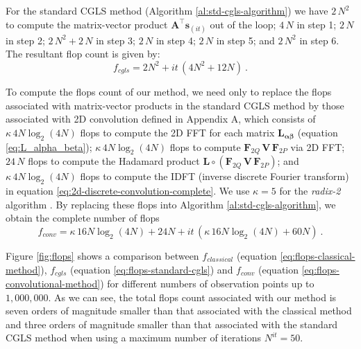 \documentclass[manuscript,noblind]{geophysics}
\begin{document}
For the standard CGLS method (Algorithm \ref{al:std-cgls-algorithm}) we have $2 \, N^2$ to compute
the matrix-vector product $\mathbf{A}^{\top} \mathbf{s}_{(it)}$ out of the loop;
$4 \, N$ in step 1; $2 \, N$ in step 2; $2 \, N^2 + 2 \, N$ in step 3; $2 \, N$ in step 4;
$2 \, N$ in step 5; and $2 \, N^2$ in step 6. The resultant flop count is given by:
\begin{equation}
	f_{cgls} =  2 N^{2} + it \, (4 N^{2} + 12 N) \: .
	\label{eq:flops-standard-cgls}
\end{equation}


To compute the flops count of our method, we need only to replace the flops associated with 
matrix-vector products in the standard CGLS method by those associated with
2D convolution defined in Appendix A, which consists of $\kappa  \, 4 N \log_2(4N)$ flops to
compute the 2D FFT for each matrix $\mathbf{L}_{\boldsymbol{\alpha\beta}}$ (equation 
\ref{eq:L_alpha_beta}); $\kappa  \, 4 N \log_2(4N)$ flops to compute 
$\mathbf{F}_{2Q} \, \mathbf{V} \, \mathbf{F}_{2P}$ via 2D FFT; $24 \, N$ flops to compute the 
Hadamard product $\mathbf{L} \circ \left(\mathbf{F}_{2Q} \, \mathbf{V} \, \mathbf{F}_{2P} \right)$; 
and $\kappa  \, 4 N \log_2(4N)$ flops to compute the IDFT (inverse discrete Fourier transform) in equation 
\ref{eq:2d-discrete-convolution-complete}. We use $\kappa = 5$ for the \emph{radix-2} algorithm
\citep[][ p.~15]{vanloan1992}. By replacing these flops into Algorithm \ref{al:std-cgls-algorithm},
we obtain the complete number of flops
\begin{equation}
	f_{conv} =  \kappa  \, 16 N \log_2(4 N) + 24 N + it \, (\kappa  \, 16 N \log_2 (4 N) + 60 N) \: .
	\label{eq:flops-convolutional-method}
\end{equation}

Figure \ref{fig:flops} shows a comparison between 
$f_{classical}$ (equation \ref{eq:flops-classical-method}), 
$f_{cgls}$ (equation \ref{eq:flops-standard-cgls}) and 
$f_{conv}$ (equation \ref{eq:flops-convolutional-method})
for different numbers of observation points up to $1,000,000$. As we can see, 
the total flops count associated with our method is seven orders of magnitude smaller 
than that associated with the classical method and three orders of magnitude smaller than
that associated with the standard CGLS method when using a maximum number
of iterations $N^{it} = 50$.
\end{document}
